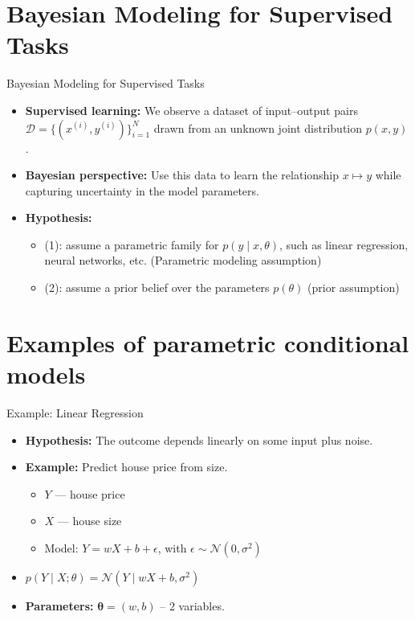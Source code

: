 \documentclass{beamer}
\begin{document}
\section{Bayesian Modeling for Supervised Tasks}
\begin{frame}{Bayesian Modeling for Supervised Tasks}

  \begin{itemize}
    \item \textbf{Supervised learning:} We observe a dataset of input–output pairs
    $\mathcal{D} = \{(x^{(i)}, y^{(i)})\}_{i=1}^N$ drawn from an unknown joint distribution $p(x, y)$.

    \item \textbf{Bayesian perspective:} Use this data to learn the relationship $x \mapsto y$ while capturing uncertainty in the model parameters.

    \item \textbf{Hypothesis:}
      \begin{itemize}
        \item (1): assume a parametric family for $p(y \mid x, \theta)$, such as linear regression, neural networks, etc. (Parametric modeling assumption)
        \item (2): assume a prior belief over the parameters $p(\theta)$ (prior assumption)
        \end{itemize}
    \end{itemize}
  \end{frame}

\section{Examples of parametric conditional models}

\begin{frame}{Example: Linear Regression}
  \begin{itemize}
    \item \textbf{Hypothesis:} The outcome depends linearly on some input plus noise.
    \item \textbf{Example:} Predict house price from size.
      \begin{itemize}
        \item $Y$ — house price
        \item $X$ — house size
        \item Model: $Y = wX + b + \epsilon$, with $\epsilon \sim \mathcal{N}(0, \sigma^2)$
      \end{itemize}
    \item $p(Y \mid X; \theta) = \mathcal{N}(Y \mid wX + b, \sigma^2)$
    \item \textbf{Parameters:} $\mathbf{\theta} = (w, b)$ -- 2 variables.
  \end{itemize}
\end{frame}
\end{document}
